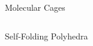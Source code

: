 \documentclass{beamer}
\begin{document}
\begin{frame}{Molecular Cages}
\begin{columns}
    \begin{column}{0.48\textwidth}

    \end{column}
    \begin{column}{0.48\textwidth}
    \end{column}
\end{columns}
\end{frame}
\begin{frame}{Self-Folding Polyhedra}
\end{frame}
\end{document}
